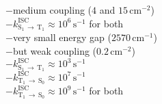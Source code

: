 \documentclass[25pt, portrait]{tikzposter}
\begin{document}
\begin{columns}
{\begin{minipage}[t]{0.595\colwidth}
{\begin{adjustbox}{valign=t}
\begin{minipage}[t]{24.6cm}
\begin{minipage}[t]{7.9cm}
		\end{minipage}
	 \begin{adjustbox}{valign=t}
		\begin{minipage}[t]{15.5cm}
				$-$medium coupling ($4$ and $15\,$cm$^{-2}$) \\
				$-k^\mathrm{ISC}_{\mathrm{S}_1\,\rightarrow\,\mathrm{T}_1}\approx 10^6\,\mathrm{s}^{-1}$ for both\\[0.6cm]
				$-$very small energy gap ($2570\,\mathrm{cm}^{-1}$)\\ 
				$-$but weak coupling ($0.2\,\mathrm{cm}^{-2}$) \\
				$-k^\mathrm{ISC}_{\mathrm{S}_1\,\rightarrow\,\mathrm{T}_1}\approx 10^3\,\mathrm{s}^{-1}$\\[0.5cm]
				$-k^\mathrm{ISC}_{\mathrm{T}_1\,\rightarrow\,\mathrm{S}_0}\approx 10^7\,\mathrm{s}^{-1}$\\[.8 cm]
				$-k^\mathrm{ISC}_{\mathrm{T}_1\,\rightarrow\,\mathrm{S}_0}\approx 10^9\,\mathrm{s}^{-1}$ for both \\
		\end{minipage}
		\end{adjustbox}
	\end{minipage}
	\end{adjustbox}	
        }
      \end{minipage}
    }
\begin{subcolumns}
\end{subcolumns}
\end{columns}
\end{document}
